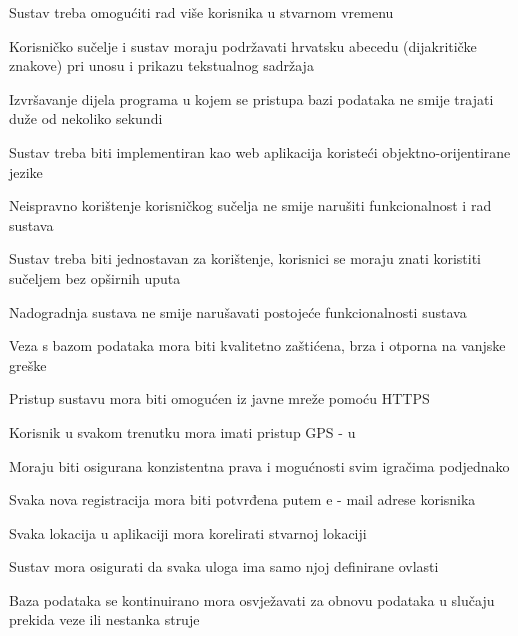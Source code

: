		\begin{packed_item}
			\item Sustav treba omogućiti rad više korisnika u stvarnom vremenu
			\item Korisničko sučelje i sustav moraju podržavati hrvatsku abecedu (dijakritičke znakove) pri unosu i prikazu tekstualnog sadržaja
			\item Izvršavanje dijela programa u kojem se pristupa bazi podataka ne smije trajati duže od nekoliko sekundi
			\item Sustav treba biti implementiran kao web aplikacija koristeći objektno-orijentirane jezike
			\item Neispravno korištenje korisničkog sučelja ne smije narušiti funkcionalnost i rad sustava
			\item Sustav treba biti jednostavan za korištenje, korisnici se moraju znati koristiti sučeljem bez opširnih uputa
			\item Nadogradnja sustava ne smije narušavati postojeće funkcionalnosti sustava
			\item Veza s bazom podataka mora biti kvalitetno zaštićena, brza i otporna na vanjske greške
			\item Pristup sustavu mora biti omogućen iz javne mreže pomoću HTTPS
			\item Korisnik u svakom trenutku mora imati pristup GPS - u
			\item Moraju biti osigurana konzistentna prava i mogućnosti svim igračima podjednako
			\item Svaka nova registracija mora biti potvrđena putem e - mail adrese korisnika
			\item Svaka lokacija u aplikaciji mora korelirati stvarnoj lokaciji
			\item Sustav mora osigurati da svaka uloga ima samo njoj definirane ovlasti
			\item Baza podataka se kontinuirano mora osvježavati za obnovu podataka u slučaju prekida veze ili nestanka struje
		\end{packed_item}




